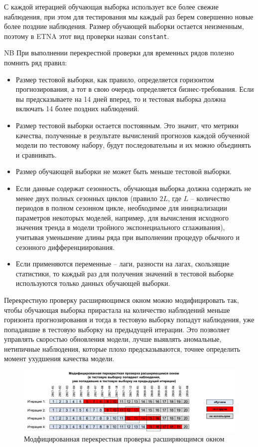 \documentclass[%
	11pt,
	a4paper,
	utf8,
		]{article}
\begin{document}
С каждой итерацией обучающая выборка использует все более свежие наблюдения, при этом для тестирования мы каждый раз берем совершенно новые более поздние наблюдения. Размер обучающей выборки остается неизменным, поэтому в ETNA этот вид проверки назван \verb|constant|.

NB При выполнении перекрестной проверки для временных рядов полезно помнить ряд правил:
\begin{itemize}
	\item Размер тестовой выборки, как правило, определяется горизонтом прогнозирования, а тот в свою очередь определяется бизнес-требования. Если вы предсказываете на 14 дней вперед, то и тестовая выборка должна включать 14 более поздних наблюдений.
	
	\item Размер тестовой выборки остается постоянным. Это значит, что метрики качества, полученные в результате вычислений прогнозов каждой обученной модели по тестовому набору, будут последовательны и их можно объединять и сравнивать.
	
	\item Размер обучающей выборки не может быть меньше тестовой выборки.
	
	\item Если данные содержат сезонность, обучающая выборка должна содержать не менее двух полных сезонных циклов (правило $ 2L $, где $ L $ -- количество периодов в полном сезонном цикле, необходимое для инициализации параметров некоторых моделей, например, для вычисления исходного значения тренда в модели тройного экспонециального сглаживания), учитывая уменьшение длины ряда при выполнении процедур обычного и сезонного дифференциирования.
	
	\item Если применяются переменные -- лаги, разности на лагах, скользящие статистики, то каждый раз для получения значений в тестовой выборке используются только данных обучающей выборки.
\end{itemize}

Перекрестную проверку расширяющимся окном можно модифицировать так, чтобы обучающая выборка прирастала на количество наблюдений меньше горизонта прогнозирования и тогда в тестовую выборку попадут наблюдения, уже попадавшие в тестовую выборку на предыдущей итерации. Это позволяет управлять скоростью обновления модели, лучше выявлять аномальные, нетипичные наблюдения, которые плохо предсказываются, точнее определить момент ухудшения качества модели.

\begin{figure}[h]
	\centering
	\includegraphics[scale=0.3]{figures/cross_val_expand_ts.png}
	\caption{ Модфицированная перекрестная проверка расширяющимся окном }\label{fig:cross_val_expand_ts}
\end{figure}
\end{document}
